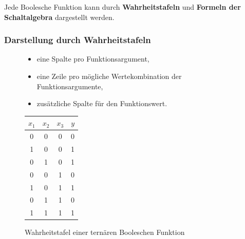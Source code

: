 \documentclass[12pt]{report}
\begin{document}
Jede Boolesche Funktion kann durch \textbf{Wahrheitstafeln} und \textbf{Formeln der Schaltalgebra} dargestellt werden.

\subsubsection{Darstellung durch Wahrheitstafeln}
\begin{figure}[H]
  \begin{minipage}[t]{0.5\textwidth}
    \begin{itemize}
      \item eine Spalte pro Funktionsargument,
      \item eine Zeile pro mögliche Wertekombination der Funktionsargumente,
      \item zusätzliche Spalte für den Funktionswert.
    \end{itemize}
  \end{minipage}
  \hfill
  \begin{minipage}[t]{0.4\textwidth}
    \caption{Wahrheitstafel einer ternären Booleschen Funktion}
    \centering
    \begin{tabular}{ccc|c}
      $x_1$ & $x_2$ & $x_3$ & $y$  \\ \hline
      0     & 0     & 0     & 0    \\
      1     & 0     & 0     & 1    \\
      0     & 1     & 0     & 1    \\
      0     & 0     & 1     & 0    \\
      1     & 0     & 1     & 1    \\
      0     & 1     & 1     & 0    \\
      1     & 1     & 1     & 1   
    \end{tabular}
  \end{minipage}
\end{figure}
\end{document}
